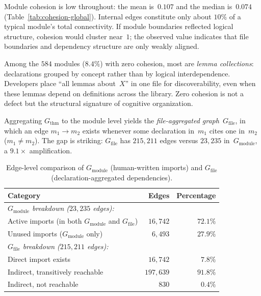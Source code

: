 Module cohesion is low throughout: the mean is~$0.107$ and the median is~$0.074$ (Table~\ref{tab:cohesion-global}). Internal edges constitute only about $10\%$ of a typical module's total connectivity. If module boundaries reflected logical structure, cohesion would cluster near~$1$; the observed value indicates that file boundaries and dependency structure are only weakly aligned.

\label{rem:zero-cohesion}
Among the $584$ modules ($8.4\%$) with zero cohesion, most are \emph{lemma collections}: declarations grouped by concept rather than by logical interdependence. Developers place ``all lemmas about~$X$'' in one file for discoverability, even when these lemmas depend on definitions across the library. Zero cohesion is not a defect but the structural signature of cognitive organization.

\label{sec:import_vs_declaration}
Aggregating $G_{\mathrm{thm}}$ to the module level yields the \emph{file-aggregated graph}~$G_{\mathrm{file}}$, in which an edge $m_1 \to m_2$ exists whenever some declaration in~$m_1$ cites one in~$m_2$ ($m_1 \neq m_2$). The gap is striking: $G_{\mathrm{file}}$ has $215{,}211$ edges versus $23{,}235$ in~$G_{\mathrm{module}}$, a $9.1\times$ amplification.

\begin{table}[ht]
\centering
\caption{Edge-level comparison of $G_{\mathrm{module}}$ (human-written imports) and $G_{\mathrm{file}}$ (declaration-aggregated dependencies).}
\label{tab:import-vs-file}
\begin{tabular}{lrr}
\toprule
Category & Edges & Percentage \\
\midrule
\multicolumn{3}{l}{\emph{$G_{\mathrm{module}}$ breakdown ($23{,}235$ edges):}} \\
\quad Active imports (in both $G_{\mathrm{module}}$ and $G_{\mathrm{file}}$) & $16{,}742$ & $72.1\%$ \\
\quad Unused imports ($G_{\mathrm{module}}$ only) & $6{,}493$ & $27.9\%$ \\
\midrule
\multicolumn{3}{l}{\emph{$G_{\mathrm{file}}$ breakdown ($215{,}211$ edges):}} \\
\quad Direct import exists & $16{,}742$ & $7.8\%$ \\
\quad Indirect, transitively reachable & $197{,}639$ & $91.8\%$ \\
\quad Indirect, not reachable & $830$ & $0.4\%$ \\
\bottomrule
\end{tabular}
\end{table}

